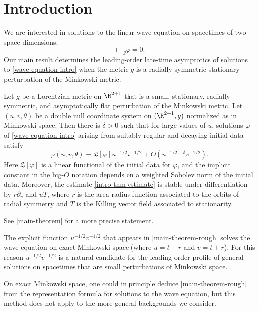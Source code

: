 \documentclass[10pt, reqno]{amsart}
\begin{document}
\section{Introduction}
We are interested in solutions to the linear wave equation on spacetimes of two
space dimensions:
\begin{equation}\label{wave-equation-intro}
\Box{}_g\varphi{} = 0.
\end{equation}
Our main result determines the leading-order late-time asymptotics of solutions
to \cref{wave-equation-intro} when the metric \(g\) is a radially symmetric stationary
perturbation of the Minkowski metric.
\begin{theorem}
Let \(g\) be a Lorentzian metric on \(\R^{2 + 1}\) that is a small, stationary,
radially symmetric, and asymptotically flat perturbation of the Minkowski metric. Let
\((u,v,\theta{})\) be a double null coordinate system on \((\R^{2 + 1},g)\)
normalized as in Minkowski space. Then there is \(\delta{} > 0\) such that for
large values of \(u\), solutions \(\varphi{}\) of
\cref{wave-equation-intro} arising from suitably regular and decaying initial data
satisfy
\begin{equation}\label{intro-thm-estimate}
\varphi{}(u,v,\theta{}) = \mathfrak{L}[\varphi{}]u^{-1/2}v^{-1/2} + O(u^{-1/2-\delta{}}v^{-1/2}).
\end{equation}
Here \(\mathfrak{L}[\varphi{}]\) is a linear functional of
the initial data for \(\varphi{}\), and the implicit constant in the big-\(O\) notation
depends on a weighted Sobolev norm of the initial data. Moreover, the estimate
\cref{intro-thm-estimate} is stable under differentiation by \(r\partial{}_v\) and
\(uT\), where \(r\) is the area-radius function associated to the orbits of
radial symmetry and \(T\) is the Killing vector field associated to
stationarity.
\label{main-theorem-rough}
\end{theorem}
See \cref{main-theorem} for a more precise statement.
\begin{remark}
The explicit function \(u^{-1/2}v^{-1/2}\) that appears in
\cref{main-theorem-rough} solves the wave equation on exact Minkowski space (where
\(u = t-r\) and \(v = t + r\)). For this reason \(u^{-1/2}v^{-1/2}\) is a
natural candidate for the leading-order profile of general solutions on
spacetimes that are small perturbations of Minkowski space.
\end{remark}
\begin{remark}
On exact Minkowski space, one could in principle deduce \cref{main-theorem-rough} from the
representation formula for solutions to the wave equation, but this method does
not apply to the more general backgrounds we consider.
\end{remark}
\end{document}
